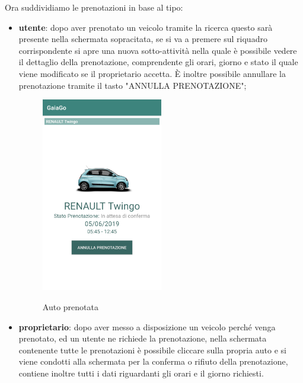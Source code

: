 Ora suddividiamo le prenotazioni in base al tipo:
\begin{itemize}
	\item \textbf{utente}: dopo aver prenotato un veicolo tramite la ricerca questo sarà presente nella schermata sopracitata, se si va a premere sul riquadro corrispondente si apre una nuova sotto-attività nella quale è possibile vedere il dettaglio della prenotazione, comprendente gli orari, giorno e stato il quale viene modificato se il proprietario accetta. È inoltre possibile annullare la prenotazione tramite il tasto "ANNULLA PRENOTAZIONE";
	  \begin{figure}[H] 
		\centering 
		\includegraphics[width=0.5\textwidth]{res/images/prenotazione2.png}\\
		\caption{Auto prenotata}
		\label{prenotata}
	\end{figure}
\pagebreak
	\item \textbf{proprietario}: dopo aver messo a disposizione un veicolo perché venga prenotato, ed un utente ne richiede la prenotazione, nella schermata contenente tutte le prenotazioni è possibile cliccare sulla propria auto e si viene condotti alla schermata per la conferma o rifiuto della prenotazione, contiene inoltre tutti i dati riguardanti gli orari e il giorno richiesti.
	  \begin{figure}[H] 
		\centering 

\end{figure}
\end{itemize}

